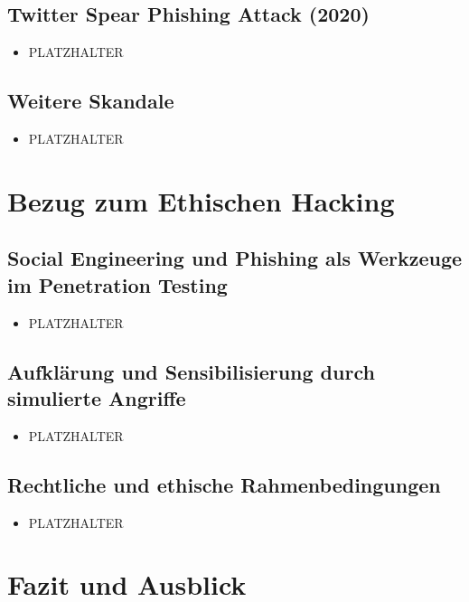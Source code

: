 \documentclass[12pt, a4paper, oneside]{scrartcl}
\begin{document}
\subsection{Twitter Spear Phishing Attack (2020)}
\begin{itemize}
  \item PLATZHALTER
\end{itemize}

\subsection{Weitere Skandale}
\begin{itemize}
  \item PLATZHALTER
\end{itemize}

\section{Bezug zum Ethischen Hacking}

\subsection{Social Engineering und Phishing als Werkzeuge im Penetration Testing}
\begin{itemize}
  \item PLATZHALTER
\end{itemize}

\subsection{Aufklärung und Sensibilisierung durch simulierte Angriffe}
\begin{itemize}
  \item PLATZHALTER
\end{itemize}

\subsection{Rechtliche und ethische Rahmenbedingungen}
\begin{itemize}
  \item PLATZHALTER
\end{itemize}

\section{Fazit und Ausblick}
\end{document}
